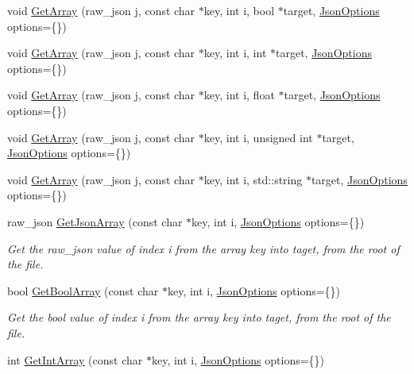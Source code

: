 \begin{DoxyCompactItemize}
void \hyperlink{classTarbora_1_1Json_a2a59a8382b451df04cbd29fa866a8968}{Get\+Array} (raw\+\_\+json j, const char $\ast$key, int i, bool $\ast$target, \hyperlink{structTarbora_1_1JsonOptions}{Json\+Options} options=\{\})
\item 
void \hyperlink{classTarbora_1_1Json_a74e452798d5d9d134c04c70cbde4e7b0}{Get\+Array} (raw\+\_\+json j, const char $\ast$key, int i, int $\ast$target, \hyperlink{structTarbora_1_1JsonOptions}{Json\+Options} options=\{\})
\item 
void \hyperlink{classTarbora_1_1Json_a41297480bdcb44440a971721252d738f}{Get\+Array} (raw\+\_\+json j, const char $\ast$key, int i, float $\ast$target, \hyperlink{structTarbora_1_1JsonOptions}{Json\+Options} options=\{\})
\item 
void \hyperlink{classTarbora_1_1Json_a1ceb9a588f925ed34406dde97d068cad}{Get\+Array} (raw\+\_\+json j, const char $\ast$key, int i, unsigned int $\ast$target, \hyperlink{structTarbora_1_1JsonOptions}{Json\+Options} options=\{\})
\item 
void \hyperlink{classTarbora_1_1Json_ad135d29bb8d9338a026a2a6f71bcfc47}{Get\+Array} (raw\+\_\+json j, const char $\ast$key, int i, std\+::string $\ast$target, \hyperlink{structTarbora_1_1JsonOptions}{Json\+Options} options=\{\})
\item 
raw\+\_\+json \hyperlink{classTarbora_1_1Json_ab44082ff293945651c41ae82ee45a995}{Get\+Json\+Array} (const char $\ast$key, int i, \hyperlink{structTarbora_1_1JsonOptions}{Json\+Options} options=\{\})
\begin{DoxyCompactList}\small\item\em Get the raw\+\_\+json value of index {\itshape i} from the array {\itshape key} into {\itshape taget}, from the root of the file. \end{DoxyCompactList}\item 
bool \hyperlink{classTarbora_1_1Json_acfc1e64adfc651164491f33938054435}{Get\+Bool\+Array} (const char $\ast$key, int i, \hyperlink{structTarbora_1_1JsonOptions}{Json\+Options} options=\{\})
\begin{DoxyCompactList}\small\item\em Get the bool value of index {\itshape i} from the array {\itshape key} into {\itshape taget}, from the root of the file. \end{DoxyCompactList}\item 
int \hyperlink{classTarbora_1_1Json_af4da581a98f4b6dffc0a71458d810320}{Get\+Int\+Array} (const char $\ast$key, int i, \hyperlink{structTarbora_1_1JsonOptions}{Json\+Options} options=\{\})

\end{DoxyCompactItemize}
